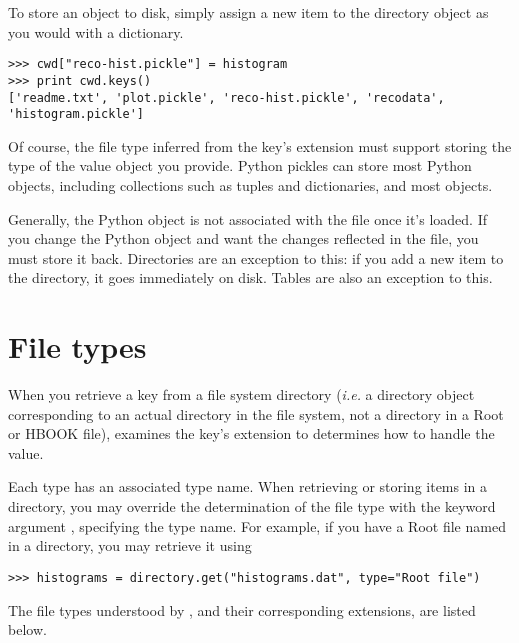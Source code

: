 To store an object to disk, simply assign a new item to the directory
object as you would with a dictionary.
\begin{verbatim}
>>> cwd["reco-hist.pickle"] = histogram
>>> print cwd.keys()
['readme.txt', 'plot.pickle', 'reco-hist.pickle', 'recodata', 'histogram.pickle']
\end{verbatim}
Of course, the file type inferred from the key's extension must support
storing the type of the value object you provide.  Python pickles can
store most Python objects, including collections such as tuples and
dictionaries, and most \pyhep objects.

Generally, the Python object is not associated with the file once it's
loaded.  If you change the Python object and want the changes reflected
in the file, you must store it back.  Directories are an exception to
this: if you add a new item to the directory, it goes immediately on
disk.  Tables are also an exception to this.


\section{File types}

When you retrieve a key from a file system directory (\textit{i.e.} a
directory object corresponding to an actual directory in the file
system, not a directory in a Root or HBOOK file), \pyhep examines the
key's extension to determines how to handle the value.  

Each type has an associated type name.  When retrieving or storing items
in a directory, you may override the determination of the file type with
the keyword argument , specifying the type name.  For
example, if you have a Root file named  in a
directory, you may retrieve it using
\begin{verbatim}
>>> histograms = directory.get("histograms.dat", type="Root file")
\end{verbatim}

The file types understood by \pyhep, and their corresponding extensions,
are listed below.

